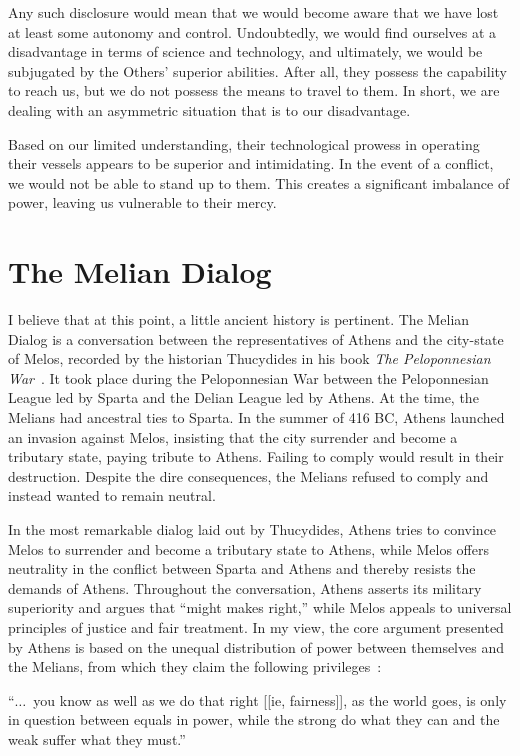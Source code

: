 Any such disclosure would mean that we would become aware that we have lost at least some autonomy and control.
Undoubtedly, we would find ourselves at a disadvantage in terms of science and technology, and ultimately,
we would be subjugated by the Others' superior abilities. After all, they possess the capability to reach us,
but we do not possess the means to travel to them.
In short, we are dealing with an asymmetric situation that is to our disadvantage.

Based on our limited understanding, their technological prowess in operating their vessels appears to be superior and intimidating.
In the event of a conflict, we would not be able to stand up to them.
This creates a significant imbalance of power, leaving us vulnerable to their mercy.



\section{The Melian Dialog}

I believe that at this point, a little ancient history is pertinent. The Melian Dialog is a conversation between the representatives of Athens and the city-state of Melos, recorded by the historian Thucydides in his book \textit{The Peloponnesian War}~\cite{ThucydidesHoPW}. It took place during the Peloponnesian War between the Peloponnesian League led by Sparta and the Delian League led by Athens. At the time, the Melians had ancestral ties to Sparta. In the summer of 416 BC, Athens launched an invasion against Melos, insisting that the city surrender and become a tributary state, paying tribute to Athens. Failing to comply would result in their destruction. Despite the dire consequences, the Melians refused to comply and instead wanted to remain neutral.

In the most remarkable dialog laid out by Thucydides, Athens tries to convince Melos to surrender and become a tributary state to Athens, while Melos offers neutrality in the conflict between Sparta and Athens and thereby resists the demands of Athens. Throughout the conversation, Athens asserts its military superiority and argues that ``might makes right,'' while Melos appeals to universal principles of justice and fair treatment. In my view, the core argument presented by Athens is based on the unequal distribution of power between themselves and the Melians, from which they claim the following privileges~\cite{ThucydidesHoPW}:
\begin{svgraybox}
``$\ldots$~you know as well as we do that right [[ie, fairness]], as the world goes, is only in question between equals in power,
 while the strong do what they can and the weak suffer what they must.''
\end{svgraybox}

